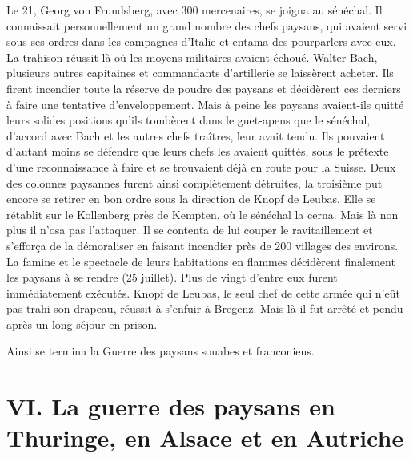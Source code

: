 \documentclass[french,twoside]{book} %
\newcommand\chapteropen{} %
\newcommand\chapterclose{} %
\begin{document}
Le 21, Georg von Frundsberg, avec 300 mercenaires, se joigna au sénéchal. Il connaissait personnellement un grand nombre des chefs paysans, qui avaient servi sous ses ordres dans les campagnes d’Italie et entama des pourparlers avec eux. La trahison réussit là où les moyens militaires avaient échoué. Walter Bach, plusieurs autres capitaines et commandants d’artillerie se laissèrent acheter. Ils firent incendier toute la réserve de poudre des paysans et décidèrent ces derniers à faire une tentative d’enveloppement. Mais à peine les paysans avaient-ils quitté leurs solides positions qu’ils tombèrent dans le guet-apens que le sénéchal, d’accord avec Bach et les autres chefs traîtres, leur avait tendu. Ils pouvaient d’autant moins se défendre que leurs chefs les avaient quittés, sous le prétexte d’une reconnaissance à faire et se trouvaient déjà en route pour la Suisse. Deux des colonnes paysannes furent ainsi complètement détruites, la troisième put encore se retirer en bon ordre sous la direction de Knopf de Leubas. Elle se rétablit sur le Kollenberg près de Kempten, où le sénéchal la cerna. Mais là non plus il n’osa pas l’attaquer. Il se contenta de lui couper le ravitaillement et s’efforça de la démoraliser en faisant incendier près de 200 villages des environs. La famine et le spectacle de leurs habitations en flammes décidèrent finalement les paysans à se rendre (25 juillet). Plus de vingt d’entre eux furent immédiatement exécutés. Knopf de Leubas, le seul chef de cette armée qui n’eût pas trahi son drapeau, réussit à s’enfuir à Bregenz. Mais là il fut arrêté et pendu après un long séjour en prison.\par
Ainsi se termina la Guerre des paysans souabes et franconiens.
\chapterclose


\chapteropen
\chapter[{VI. La guerre des paysans en Thuringe, en Alsace et en Autriche}]{VI. La guerre des paysans en Thuringe, en Alsace et en Autriche}\renewcommand{\leftmark}{VI. La guerre des paysans en Thuringe, en Alsace et en Autriche}
\end{document}
